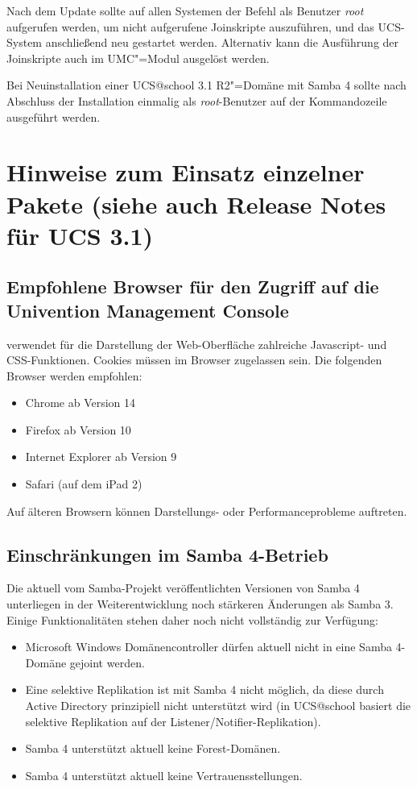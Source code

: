 Nach dem Update sollte auf allen Systemen der
Befehl  als
Benutzer \emph{root} aufgerufen werden, um nicht aufgerufene Joinskripte auszuführen, und
das UCS-System anschließend neu gestartet werden. Alternativ kann die Ausführung 
der Joinskripte auch im UMC"=Modul  ausgelöst werden.

Bei Neuinstallation einer UCS@school 3.1 R2"=Domäne mit Samba 4 sollte nach Abschluss der Installation einmalig als \emph{root}-Benutzer  auf der Kommandozeile ausgeführt werden.

\chapter{Hinweise zum Einsatz einzelner Pakete (siehe auch Release Notes für UCS 3.1)}

\section{Empfohlene Browser für den Zugriff auf die Univention Management Console}

\ucsUMC{} verwendet für die Darstellung der Web-Oberfläche zahlreiche
Javascript- und CSS-Funktionen. Cookies müssen im Browser zugelassen
sein. Die folgenden Browser werden empfohlen:

\begin{itemize}
\item Chrome ab Version 14
\item Firefox ab Version 10
\item Internet Explorer ab Version 9
\item Safari (auf dem iPad 2)
\end{itemize}

Auf älteren Browsern können Darstellungs- oder Performanceprobleme
auftreten.

\section{Einschränkungen im Samba 4-Betrieb}

Die aktuell vom Samba-Projekt veröffentlichten Versionen von Samba 4
unterliegen in der Weiterentwicklung noch stärkeren Änderungen als Samba
3. Einige Funktionalitäten stehen daher noch nicht vollständig zur Verfügung:

\begin{itemize}
\item Microsoft Windows Domänencontroller dürfen aktuell nicht in eine Samba 4-Domäne
gejoint werden.
\item Eine selektive Replikation ist mit Samba 4 nicht möglich, da diese durch
Active Directory prinzipiell nicht unterstützt wird (in UCS@school
basiert die selektive Replikation auf der Listener/Notifier-Replikation).
\item Samba 4 unterstützt aktuell keine Forest-Domänen. 
\item Samba 4 unterstützt aktuell keine Vertrauensstellungen.
\end{itemize}

